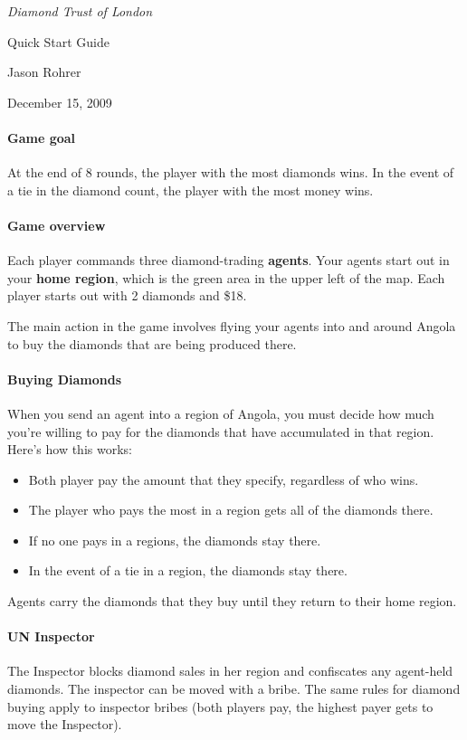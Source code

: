 \documentclass[12pt]{article}
\begin{document}
\begin{center}

{\Large 
{\it Diamond Trust of London}

Quick Start Guide
}

Jason Rohrer

December 15, 2009

\end{center}


\paragraph{Game goal}

At the end of 8 rounds, the player with the most diamonds wins.  In the event of a tie in the diamond count, the player with the most money wins.

\paragraph{Game overview}
Each player commands three diamond-trading {\bf agents}.  Your agents start out in your {\bf home region}, which is the green area in the upper left of the map.  Each player starts out with 2 diamonds and \$18.

The main action in the game involves flying your agents into and around Angola to buy the diamonds that are being produced there.

\paragraph{Buying Diamonds}
When you send an agent into a region of Angola, you must decide how much you're willing to pay for the diamonds that have accumulated in that region.  Here's how this works:
\begin{itemize}
\item Both player pay the amount that they specify, regardless of who wins.
\item The player who pays the most in a region gets all of the diamonds there.
\item If no one pays in a regions, the diamonds stay there.
\item In the event of a tie in a region, the diamonds stay there.
\end{itemize}
Agents carry the diamonds that they buy until they return to their home region.

\paragraph{UN Inspector}
The Inspector blocks diamond sales in her region and confiscates any agent-held diamonds.  The inspector can be moved with a bribe.  The same rules for diamond buying apply to inspector bribes (both players pay, the highest payer gets to move the Inspector).
\end{document}
